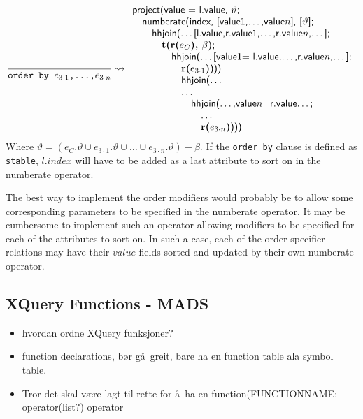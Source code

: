 \begin{equation*}
\frac{}{\mbox{\texttt{order by }}e_{3 \cdot 1}\mbox{\texttt{,\ldots,}}e_{3 \cdot n}} \leadsto
\begin{array}{l}
\mbox{\textsf{project(value = l.value, }}\vartheta\mbox{\textsf{;}}\\ \quad
\mbox{\textsf{numberate(index, [value1,\ldots,value}}n\mbox{\textsf{], [}}\vartheta\mbox{\textsf{];}} \\ \quad
\quad \mbox{\textsf{hhjoin(\ldots [l.value,r.value1,\ldots,r.value}}n\mbox{\textsf{,\ldots];}} \\ \quad
\quad \quad \mbox{\textbf{t(r(}}e_C\mbox{\textbf{), }}\beta\mbox{\textbf{)}\textsf{;}} \\ \quad \quad \quad
\quad \mbox{\textsf{hhjoin(\ldots [value1= l.value,\ldots,r.value}}n\mbox{\textsf{,\ldots];}}
\\\quad\quad\quad\quad\quad
\mbox{\textbf{r(}}e_{3 \cdot 1}\mbox{\textbf{)}\textsf{)))}}\\\quad\quad\quad\quad\quad
\mbox{\textsf{hhjoin(\ldots}}\\\quad\quad\quad\quad\quad
\mbox{\textsf{\ldots}}\\\quad\quad\quad\quad\quad\quad
\mbox{\textsf{hhjoin(\ldots,value}}n\mbox{\textsf{=r.value\ldots;}}\\\quad\quad\quad\quad\quad\quad\quad
\mbox{\textsf{\ldots}}\\\quad\quad\quad\quad\quad\quad\quad
\mbox{\textbf{r(}}e_{3 \cdot n}\mbox{\textbf{)}\textsf{)))}}
\end{array}
\end{equation*}
Where $\vartheta=(e_C.\vartheta \cup e_{3 \cdot 1}.\vartheta \cup \ldots \cup e_{3 \cdot n}.\vartheta) - \beta$.
If the \texttt{order by} clause is defined as \texttt{stable}, $l.index$ will have to be added as a last attribute
to sort on in the \textsf{numberate} operator.

The best way to implement the order modifiers would probably be to allow some corresponding parameters to be
specified in the \textsf{numberate} operator. It may be cumbersome to implement such an operator allowing
modifiers to be specified for each of the attributes to sort on. In such a case, each of the order specifier
relations may have their $value$ fields sorted and updated by their own \textsf{numberate} operator.


	
		
\subsection{XQuery Functions - {MADS}}
\label{sect:disc:functions}
\begin{itemize}
  \item hvordan ordne XQuery funksjoner?
  \item function declarations, b\o r g\aa~greit, bare ha en function table ala symbol table.
  \item Tror det skal v\ae re lagt til rette for \aa~ha en \textsf{function(FUNCTIONNAME; operator(list?)} operator
  \end{itemize}
  
